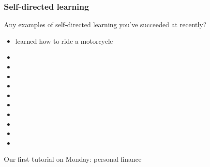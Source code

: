 \begin{frame}\frametitle{Self-directed learning}
	Any examples of self-directed learning you've succeeded at recently?
	\begin{itemize}
		\item	learned how to ride a motorcycle
		\item	\iftoggle{instructor}{learn how to fix drywall}{}
		\item	\iftoggle{instructor}{change your car's oil}{}		
		\item	\iftoggle{instructor}{unclog drains in your house}{}
		\item	\iftoggle{instructor}{cook an ethnic food dish to impress your date}{}
		\item	\iftoggle{instructor}{something learned during your co-op work term?}{}
		\item	\iftoggle{instructor}{process of buying a car or a house}{}
		\item	\iftoggle{instructor}{plant, grow and maintain your own vegetables}{}
		\item	\iftoggle{instructor}{learn a new language for travel purpose}{}
		\item	\iftoggle{instructor}{start your own company and run it: what is required?}{}
		\item	\iftoggle{instructor}{am I better off buying a new car or a used car?}{}
	\end{itemize}
	\vspace{12pt}
	Our first tutorial on Monday: personal finance
\end{frame}

